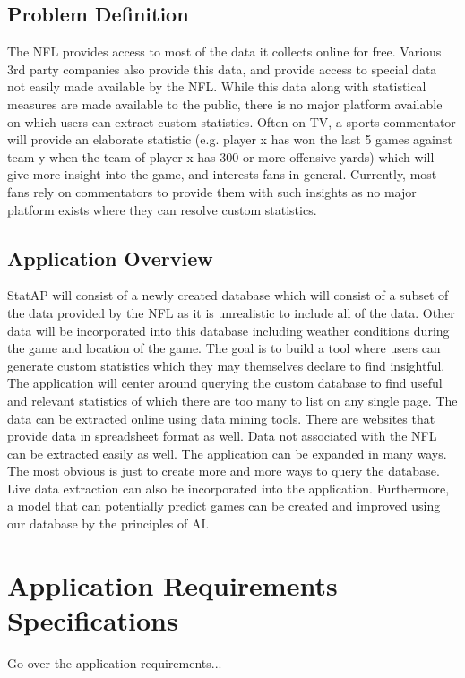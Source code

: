 \documentclass[12pt,letterpaper]{article}
\begin{document}
\subsection{Problem Definition}
The NFL provides access to most of the data it collects online for free. Various 3rd party companies also provide this data, and provide access to special data not easily made available by the NFL. While this data along with statistical measures are made available to the public, there is no major platform available on which users can extract custom statistics. Often on TV, a sports commentator will provide an elaborate statistic (e.g. player x has won the last 5 games against team y when the team of player x has 300 or more offensive yards) which will give more insight into the game, and interests fans in general. Currently, most fans rely on commentators to provide them with such insights as no major platform exists where they can resolve custom statistics.

\subsection{Application Overview}
StatAP will consist of a newly created database which will consist of a subset of the data provided by the NFL as it is unrealistic to include all of the data. Other data will be incorporated into this database including weather conditions during the game and location of the game. The goal is to build a tool where users can generate custom statistics which they may themselves declare to find insightful. The application will center around querying the custom database to find useful and relevant statistics of which there are too many to list on any single page.
The data can be extracted online using data mining tools. There are websites that provide data in spreadsheet format as well. Data not associated with the NFL can be extracted easily as well.
The application can be expanded in many ways. The most obvious is just to create more and more ways to query the database. Live data extraction can also be incorporated into the application. Furthermore, a model that can potentially predict games can be created and improved using our database by the principles of AI.
\clearpage\null

\section{Application Requirements Specifications}
Go over the application requirements...
\end{document}
